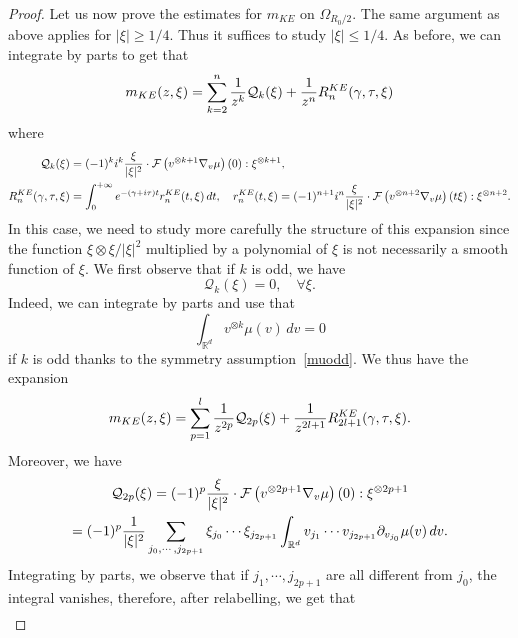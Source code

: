 \documentclass[11pt]{amsart}
\numberwithin{equation}{section}
\begin{document}
\begin{proof}
    Let us now prove the estimates for $m_{KE}$ on $\Omega_{R_0/2}$. The same argument as above applies for $| \xi| \geq {1/4}$.
   Thus it suffices to study $| \xi| \leq {1/4}$. As before, we can integrate by parts to get that
         \begin{equation}
   \label{mKExismall}
    m_{KE}(z, \xi)=  \sum_{k= 2}^n
     { 1 \over z^k}  \mathcal{Q}_{k}(\xi)   +   { 1 \over z^n} R^{KE}_{n}(\gamma, \tau, \xi)
    \end{equation}
    where
    $$
  \begin{aligned} \mathcal{Q}_{k}(\xi)&= (-1)^{k}i^k {\xi \over |\xi|^2} \cdot \mathcal{F}\left( v^{\otimes k+1}\nabla_{v} \mu \right) (0): \xi^{\otimes k+1}, \\
       R_{n}^{KE}(\gamma, \tau, \xi) &=  \int_{0}^{+ \infty} e^{-(\gamma + i \tau) t} r_{n}^{KE}(t,\xi)\, dt, \quad r_{n}^{KE}(t,\xi)=
      (-1)^{n+1} i^n {\xi \over | \xi|^2}\cdot \mathcal{F}\left(v^{\otimes n+2}\nabla_{v} \mu\right) (t\xi):\xi^{\otimes n+2}.
       \end{aligned}
 $$  
 In this case, we need to study more carefully the structure of this expansion since  the function $\xi \otimes \xi/ | \xi|^2$
  multiplied by a polynomial of $\xi$
  is not necessarily a smooth function of $\xi$.  We first observe that if $k$ is odd, we have
  $$  \mathcal{Q}_{k}(\xi) = 0, \quad \forall \xi.$$
  Indeed,  we  can integrate by parts and use that 
  $$ \int_{\mathbb{R}^d}  v^{\otimes k} \mu(v) \, dv = 0$$
   if $k$ is odd thanks to the symmetry assumption~\eqref{muodd}.  We thus have the expansion
    \begin{equation}
   \label{mKExismallbis}
    m_{KE}(z, \xi)=  \sum_{p= 1}^l
     { 1 \over z^{2p}}  \mathcal{Q}_{2p}(\xi)   +   { 1 \over z^{2l+1}} R^{KE}_{2l+1}(\gamma, \tau, \xi).
    \end{equation}  
Moreover,  we have
\begin{multline*} 
\mathcal{Q}_{2p}(\xi) =  (-1)^p {\xi \over | \xi |^2} \cdot  \mathcal{F}\left( v^{\otimes 2p+1}\nabla_{v} \mu \right) (0): \xi^{\otimes 2p+1}
\\=  (-1)^p { 1 \over | \xi|^2} \sum_{j_{0}, \cdots, j_{2p+1}} \xi_{j_{0}} \cdots \xi_{j_{2p+1}} \int_{\mathbb{R}^d}
 v_{j_{1}}\cdots v_{j_{2p+1}} \partial_{v_{j_{0}}} \mu(v) \, dv.
 \end{multline*}
 Integrating by parts, we observe that if $j_{1}, \cdots,  j_{2p+1}$ are all different from $j_{0}$, the integral vanishes, 
  therefore, after relabelling, we get that
  \begin{multline*} 

\end{multline*}
\end{proof}
\end{document}
